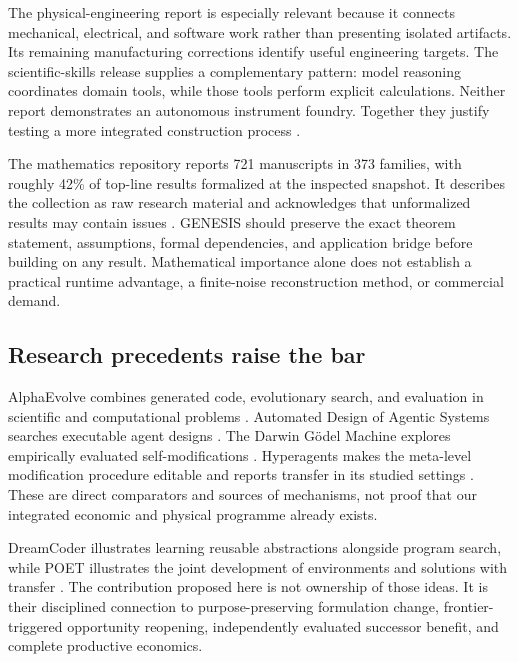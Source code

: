 \documentclass[11pt,letterpaper]{article}
\theoremstyle{remark}\newtheorem{remark}{Remark}[section]
\begin{document}
The physical-engineering report is especially relevant because it connects mechanical, electrical, and software work rather than presenting isolated artifacts. Its remaining manufacturing corrections identify useful engineering targets. The scientific-skills release supplies a complementary pattern: model reasoning coordinates domain tools, while those tools perform explicit calculations. Neither report demonstrates an autonomous instrument foundry. Together they justify testing a more integrated construction process \citep{engineering,chemistry}.

The mathematics repository reports 721 manuscripts in 373 families, with roughly 42\% of top-line results formalized at the inspected snapshot. It describes the collection as raw research material and acknowledges that unformalized results may contain issues \citep{openaimath}. GENESIS should preserve the exact theorem statement, assumptions, formal dependencies, and application bridge before building on any result. Mathematical importance alone does not establish a practical runtime advantage, a finite-noise reconstruction method, or commercial demand.

\subsection{Research precedents raise the bar}
AlphaEvolve combines generated code, evolutionary search, and evaluation in scientific and computational problems \citep{alphaevolve}. Automated Design of Agentic Systems searches executable agent designs \citep{adas}. The Darwin G\"odel Machine explores empirically evaluated self-modifications \citep{dgm}. Hyperagents makes the meta-level modification procedure editable and reports transfer in its studied settings \citep{hyperagents}. These are direct comparators and sources of mechanisms, not proof that our integrated economic and physical programme already exists.

DreamCoder illustrates learning reusable abstractions alongside program search, while POET illustrates the joint development of environments and solutions with transfer \citep{dreamcoder,poet}. The contribution proposed here is not ownership of those ideas. It is their disciplined connection to purpose-preserving formulation change, frontier-triggered opportunity reopening, independently evaluated successor benefit, and complete productive economics.
\end{document}
